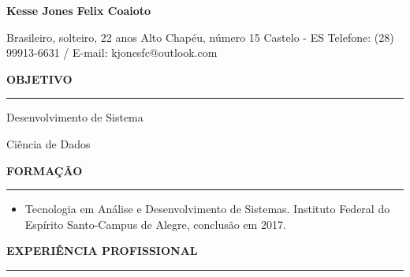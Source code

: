\documentclass[a4paper,12pt]{article}
\begin{document}

\begin{flushleft}
    \begin{huge}
        \textbf{Kesse Jones Felix Coaioto}
    \end{huge}
\end{flushleft}

\begin{flushleft}
    Brasileiro, solteiro, 22 anos
    \newline
    Alto Chap\'{e}u, n\'{u}mero 15
    \newline
    Castelo - ES
    \newline
    Telefone: (28) 99913-6631 / E-mail: kjonesfc@outlook.com\newline
\end{flushleft}

\begin{flushleft}
\textbf{OBJETIVO}
\noindent\textcolor{gray}{\rule{18cm}{1px}}
\end{flushleft}

\begin{itemize}
    \begin{item}
        Desenvolvimento de Sistema
    \end{item}
    \begin{item}
        Ciência de Dados
    \end{item}
    \newline
\end{itemize}

\begin{flushleft}
\textbf{FORMA\c{C}\~{A}O}
\noindent\textcolor{gray}{\rule{18cm}{1px}}
\end{flushleft}

\begin{flushleft}
\begin{itemize}
    \item Tecnologia em An\'{a}lise e Desenvolvimento de Sistemas. Instituto Federal do Esp\'{i}rito Santo-Campus de Alegre, conclus\~{a}o em 2017.
    \newline
\end{itemize}
\end{flushleft}

\begin{flushleft}
\textbf{EXPERI\^{E}NCIA PROFISSIONAL}
\noindent\textcolor{gray}{\rule{18cm}{1px}}
\end{flushleft}
\end{document}
